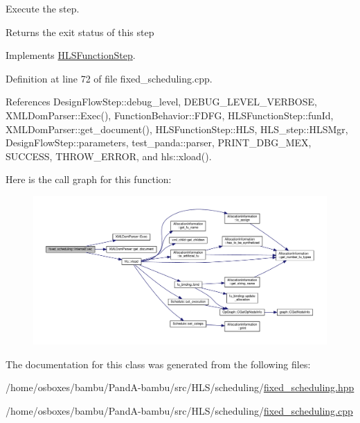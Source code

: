 Execute the step. 

\begin{DoxyReturn}{Returns}
the exit status of this step 
\end{DoxyReturn}


Implements \hyperlink{classHLSFunctionStep_a8db4c00d080655984d98143206fc9fa8}{H\+L\+S\+Function\+Step}.



Definition at line 72 of file fixed\+\_\+scheduling.\+cpp.



References Design\+Flow\+Step\+::debug\+\_\+level, D\+E\+B\+U\+G\+\_\+\+L\+E\+V\+E\+L\+\_\+\+V\+E\+R\+B\+O\+SE, X\+M\+L\+Dom\+Parser\+::\+Exec(), Function\+Behavior\+::\+F\+D\+FG, H\+L\+S\+Function\+Step\+::fun\+Id, X\+M\+L\+Dom\+Parser\+::get\+\_\+document(), H\+L\+S\+Function\+Step\+::\+H\+LS, H\+L\+S\+\_\+step\+::\+H\+L\+S\+Mgr, Design\+Flow\+Step\+::parameters, test\+\_\+panda\+::parser, P\+R\+I\+N\+T\+\_\+\+D\+B\+G\+\_\+\+M\+EX, S\+U\+C\+C\+E\+SS, T\+H\+R\+O\+W\+\_\+\+E\+R\+R\+OR, and hls\+::xload().

Here is the call graph for this function\+:
\nopagebreak
\begin{figure}[H]
\begin{center}
\leavevmode
\includegraphics[width=350pt]{d2/d79/classfixed__scheduling_a7dbf0a071862208536ac8fa0803cf8d7_cgraph}
\end{center}
\end{figure}


The documentation for this class was generated from the following files\+:\begin{DoxyCompactItemize}
\item 
/home/osboxes/bambu/\+Pand\+A-\/bambu/src/\+H\+L\+S/scheduling/\hyperlink{fixed__scheduling_8hpp}{fixed\+\_\+scheduling.\+hpp}\item 
/home/osboxes/bambu/\+Pand\+A-\/bambu/src/\+H\+L\+S/scheduling/\hyperlink{fixed__scheduling_8cpp}{fixed\+\_\+scheduling.\+cpp}\end{DoxyCompactItemize}
